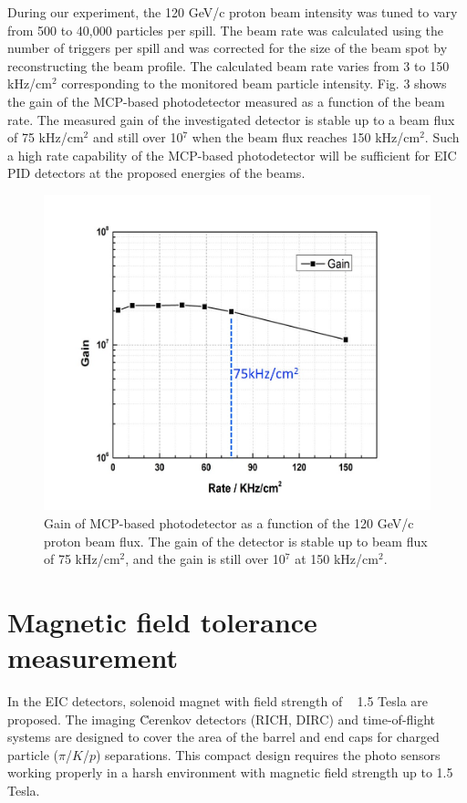 \documentclass[preprint,5p]{elsarticle}
\begin{document}
During our experiment, the 120 GeV/c proton beam intensity was tuned to vary 
from 500 to 40,000 particles per spill. The beam rate was calculated using the 
number of triggers per spill and was corrected for the size of the beam spot by 
reconstructing the beam profile. The calculated beam rate varies from 3 to 150 
kHz/cm$^2$ corresponding to the monitored beam particle intensity. Fig. 3 shows 
the gain of the MCP-based photodetector measured as a function of the beam 
rate. The measured gain of the investigated detector is stable up to a beam 
flux of 75 kHz/cm$^2$ and still over 10$^7$ when the beam flux reaches 150 
kHz/cm$^2$. Such a high rate capability of the MCP-based photodetector will be 
sufficient for EIC PID detectors at the proposed energies of the beams.

\begin{figure}[tbp]
\centering 
\includegraphics[scale=0.25]{fig/MCPs_gain_proton_beam.png}
\caption{Gain of MCP-based photodetector as a function of the 120 GeV/c proton 
beam flux. The gain of the detector is stable up to beam flux of 75 kHz/cm$^2$, 
and the gain is still over 10$^7$ at 150 kHz/cm$^2$. } 
\label{fig:MCPs_gain_proton_beam}
\end{figure}

\section{Magnetic field tolerance measurement}\label{sec_B_measurement}
In the EIC detectors, solenoid magnet with field strength of ~ 1.5 Tesla are 
proposed. The imaging \u Cerenkov detectors (RICH, DIRC) and time-of-flight 
systems are designed to cover the area of the barrel and end caps for charged 
particle ($\pi$/$K$/$p$) separations. This compact design requires the photo 
sensors working properly in a harsh environment with magnetic field strength up 
to 1.5 Tesla. 
\end{document}
